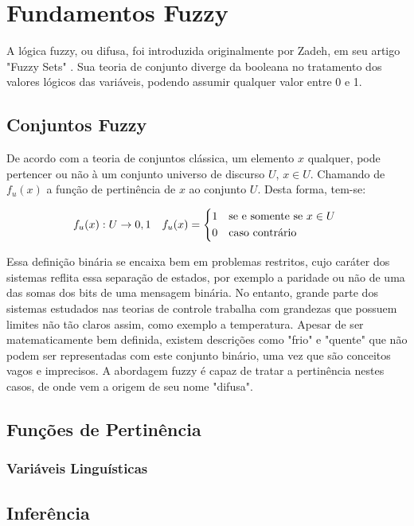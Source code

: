 %

\chapter{Fundamentos Fuzzy}
A lógica fuzzy, ou difusa, foi introduzida originalmente por Zadeh, em seu artigo "Fuzzy Sets" \cite{zadeh}. Sua teoria de conjunto diverge da booleana 
no tratamento dos valores lógicos das variáveis, podendo assumir qualquer valor entre 0 e 1. 

\section{Conjuntos Fuzzy}
\indent De acordo com a teoria de conjuntos clássica, um elemento $x$ qualquer, pode pertencer ou não à um conjunto universo de discurso $U$, $x \in U$. Chamando de $f_u(x)$ a função de pertinência de $x$ ao conjunto $U$. Desta forma, tem-se:

\begin{align}
	f_u(x) : U \rightarrow {0,1}
	&& f_u(x) =
	\begin{cases*}
		1 & se e somente se $x \in U$ \\
		0 & caso contrário
	\end{cases*}
	\label{eqFPertinencia}
\end{align}

Essa definição binária se encaixa bem em problemas restritos, cujo caráter dos sistemas reflita essa separação de estados, por exemplo a paridade ou não de uma das somas dos bits de uma mensagem binária. No entanto, grande parte dos sistemas estudados nas teorias de controle trabalha com grandezas que possuem limites não tão claros assim, como exemplo a temperatura. Apesar de ser matematicamente bem definida, existem descrições como "frio" e "quente" que não podem ser representadas com este conjunto binário, uma vez que são conceitos vagos e imprecisos. A abordagem fuzzy é capaz de tratar a pertinência nestes casos, de onde vem a origem de seu nome "difusa".

\section{Funções de Pertinência}
	\subsection{Variáveis Linguísticas}
	
\section{Inferência}

